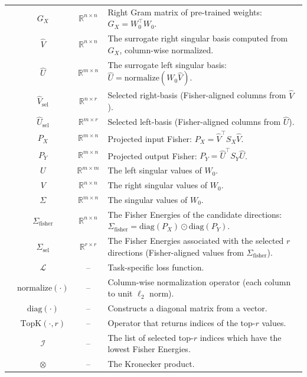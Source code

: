 \documentclass{article}
\theoremstyle{plain}
\theoremstyle{definition}
\theoremstyle{remark}
\begin{document}
\begin{table}[h!]
{\begin{tabular}{cccl}
& $G_X$ & $\mathbb{R}^{n \times n}$ & Right Gram matrix of pre-trained weights: $G_X = W_0^\top W_0$. \\
& $\hat{V}$ & $\mathbb{R}^{n \times n}$ & The surrogate right singular basis computed from $G_X$, column-wise normalized. \\
& $\hat{U}$ & $\mathbb{R}^{m \times n}$ & The surrogate left singular basis: $\hat{U} = \mathrm{normalize}(W_0 \hat{V})$. \\
& $\hat{V}_{\text{sel}}$ & $\mathbb{R}^{n \times r}$ & Selected right-basis (Fisher-aligned columns from $\hat{V}$). \\
& $\hat{U}_{\text{sel}}$ & $\mathbb{R}^{m \times r}$ & Selected left-basis (Fisher-aligned columns from $\hat{U}$). \\
& $P_X$ & $\mathbb{R}^{m \times n}$ & Projected input Fisher: $P_X = \hat{V}^\top S_X \hat{V}$. \\
& $P_Y$ & $\mathbb{R}^{m \times n}$ & Projected output Fisher: $P_Y = \hat{U}^\top S_Y \hat{U}$. \\
& $U$ & $\mathbb{R}^{m \times m}$ & The left singular values of $W_0$. \\
& $V$ & $\mathbb{R}^{n \times n}$ & The right singular values of $W_0$. \\
& $\Sigma$ & $\mathbb{R}^{m \times n}$ & The singular values of $W_0$. \\
& $\Sigma_{\text{fisher}}$ & $\mathbb{R}^{n \times n}$ & The Fisher Energies of the candidate directions: $\Sigma_{\text{fisher}} = \mathrm{diag}(P_X) \odot \mathrm{diag}(P_Y)$. \\
& $\Sigma_{\text{sel}}$ & $\mathbb{R}^{r \times r}$ & The Fisher Energies associated with the selected $r$ directions (Fisher-aligned values from $\Sigma_{\text{fisher}}$). \\
\addlinespace
\midrule
\multirow{6}{*}{Others / Operators} & $\mathcal{L}$ & -- & Task-specific loss function. \\
& $\mathrm{normalize}(\cdot)$ & -- & Column-wise normalization operator (each column to unit $\ell_2$ norm). \\
& $\mathrm{diag}(\cdot)$ & -- & Constructs a diagonal matrix from a vector. \\
& $\mathrm{TopK}(\cdot,r)$ & -- & Operator that returns indices of the top-$r$ values. \\
& $\mathcal{I}$ & -- & The list of selected top-$r$ indices which have the lowest Fisher Energies. \\
& $\otimes$ & -- & The Kronecker product. \\
\bottomrule
\end{tabular}
}

\end{table}
\end{document}
